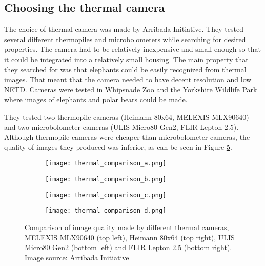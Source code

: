 \subsection{ Choosing the thermal camera} \label{choosing_thermal}

The choice of thermal camera was made by Arribada Initiative\cite{thermal_comparison}.
They tested several different thermopiles and microbolometers while searching for desired properties.
The camera had to be relatively inexpensive and small enough so that it could be integrated into a relatively small housing.
The main property that they searched for was that elephants could be easily recognized from thermal images.
That meant that the camera needed to have decent resolution and low NETD.
Cameras were tested in Whipsnade Zoo and the Yorkshire Wildlife Park where images of elephants and polar bears could be made.

They tested two thermopile cameras (Heimann 80x64, MELEXIS MLX90640) and two microbolometer cameras (ULIS Micro80 Gen2, FLIR Lepton 2.5).
Although thermopile cameras were cheaper than microbolometer cameras, the quality of images they produced was inferior, as can be seen in Figure \ref{thermal_comparison_images}.

\begin{figure}[ht]
    \begin{subfigure}{0.5\textwidth}
        \centering
        \texttt{[image: thermal\_comparison\_a.png]} 
        \label{thermal_comparison_a}
    \end{subfigure}
    \begin{subfigure}{0.5\textwidth}
        \centering
        \texttt{[image: thermal\_comparison\_b.png]} 
        \label{thermal_comparison_b}
    \end{subfigure}
    \begin{subfigure}{0.5\textwidth}
        \centering
        \texttt{[image: thermal\_comparison\_c.png]} 
        \label{thermal_comparison_c}
    \end{subfigure}
    \begin{subfigure}{0.5\textwidth}
        \centering
        \texttt{[image: thermal\_comparison\_d.png]} 
        \label{thermal_comparison_d}
    \end{subfigure}
\caption[Comparison of image quality made by different thermal cameras.]{Comparison of image quality made by different thermal cameras, MELEXIS MLX90640 (top left), Heimann 80x64 (top right), ULIS Micro80 Gen2 (bottom left) and FLIR Lepton 2.5 (bottom right). Image source: Arribada Initiative \cite{thermal_comparison}}
    \label{thermal_comparison_images}
\end{figure}

